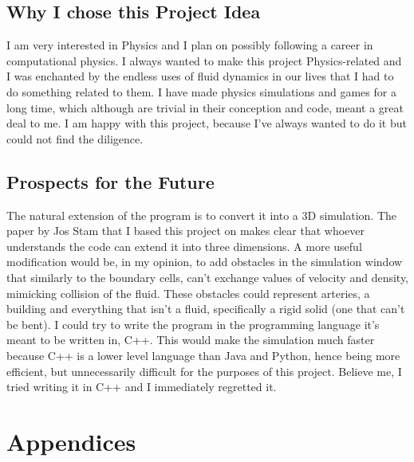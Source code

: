 \documentclass[12pt,a4paper]{book}
\begin{document}
\section{Why I chose this Project Idea}
I am very interested in Physics and I plan on possibly following a career in computational physics. I always wanted to make this project Physics-related and I was enchanted by the endless uses of fluid dynamics in our lives that I had to do something related to them. I have made physics simulations and games for a long time, which although are trivial in their conception and code, meant a great deal to me. I am happy with this project, because I've always wanted to do it but could not find the diligence.


\section{Prospects for the Future}
The natural extension of the program is to convert it into a 3D simulation. The paper by Jos Stam that I based this project on makes clear that whoever understands the code can extend it into three dimensions. A more useful modification would be, in my opinion, to add obstacles in the simulation window that similarly to the boundary cells, can't exchange values of velocity and density, mimicking collision of the fluid. These obstacles could represent arteries, a building and everything that isn't a fluid, specifically a rigid solid (one that can't be bent). I could try to write the program in the programming language it's meant to be written in, C++. This would make the simulation much faster because C++ is a lower level language than Java and Python, hence being more efficient, but unnecessarily difficult for the purposes of this project. Believe me, I tried writing it in C++ and I immediately regretted it.



\chapter{Appendices}
\end{document}
